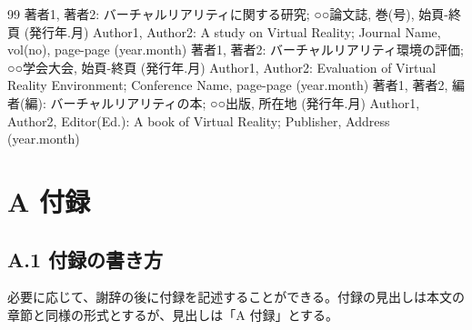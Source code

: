 \documentclass[a4paper,twoside]{jarticle}
\begin{document}
\begin{thebibliography}{99}
著者1, 著者2: バーチャルリアリティに関する研究; ○○論文誌, 巻(号), 
始頁-終頁 (発行年.月)
Author1, Author2: A study on Virtual Reality; Journal Name, vol(no), 
page-page (year.month)
著者1, 著者2: バーチャルリアリティ環境の評価; ○○学会大会, 始頁-終頁 
(発行年.月)
Author1, Author2: Evaluation of Virtual Reality Environment;
Conference Name, page-page (year.month)
著者1, 著者2, 編者(編): バーチャルリアリティの本; ○○出版, 所在地 (発行年.月)
Author1, Author2, Editor(Ed.): A book of Virtual Reality; Publisher, Address (year.month)
\end{thebibliography}

\newpage

\section*{A 付録}
\subsection*{A.1 付録の書き方}
必要に応じて、謝辞の後に付録を記述することができる。付録の見出しは本文の
章節と同様の形式とするが、見出しは「A 付録」とする。

\end{document}
